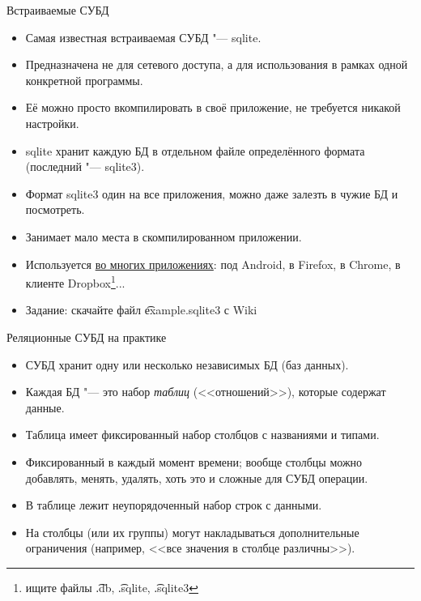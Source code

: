 \begin{frame}{Встраиваемые СУБД}
	\begin{itemize}
		\item Самая известная встраиваемая СУБД "--- sqlite.
		\item Предназначена не для сетевого доступа, а для использования в рамках одной конкретной программы.
		\item Её можно просто вкомпилировать в своё приложение, не требуется никакой настройки.
		\item sqlite хранит каждую БД в отдельном файле определённого формата (последний "--- sqlite3).
		\item Формат sqlite3 один на все приложения, можно даже залезть в чужие БД и посмотреть.
		\item Занимает мало места в скомпилированном приложении.
		\item
			Используется \href{http://www.sqlite.org/famous.html}{во многих приложениях}:
			под Android, в Firefox, в Chrome, в клиенте Dropbox\footnote{ищите файлы \t{.db}, \t{.sqlite}, \t{.sqlite3}}...
		\item Задание: скачайте файл \t{example.sqlite3} с Wiki
	\end{itemize}
\end{frame}

\begin{frame}{Реляционные СУБД на практике}
	\begin{itemize}
		\item СУБД хранит одну или несколько независимых БД (баз данных).
		\item Каждая БД "--- это набор \textit{таблиц} (<<отношений>>), которые содержат данные.
		\item Таблица имеет фиксированный набор столбцов с названиями и типами.
		\item Фиксированный в каждый момент времени; вообще столбцы можно добавлять, менять, удалять, хоть это и сложные для СУБД операции.
		\item В таблице лежит неупорядоченный набор строк с данными.
		\item На столбцы (или их группы) могут накладываться дополнительные ограничения (например, <<все значения в столбце различны>>).
	\end{itemize}
\end{frame}
